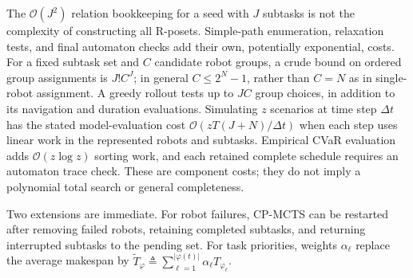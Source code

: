 \begin{revision}
The $\mathcal O(J^2)$ relation bookkeeping for a seed with $J$ subtasks
is not the complexity of constructing all R-posets. Simple-path enumeration,
relaxation tests, and final automaton checks add their own, potentially
exponential, costs. For a fixed subtask set and $C$ candidate robot groups,
a crude bound on ordered group assignments is $J!C^J$; in general
$C\le2^N-1$, rather than $C=N$ as in single-robot assignment.
A greedy rollout tests up to $JC$ group choices, in addition to its
navigation and duration evaluations. Simulating $z$ scenarios at time step
$\Delta t$ has the stated model-evaluation cost
$\mathcal O(zT(J+N)/\Delta t)$ when each step uses linear work in the
represented robots and subtasks. Empirical CVaR evaluation adds
$\mathcal O(z\log z)$ sorting work, and each retained complete schedule
requires an automaton trace check. These are component costs; they do not
imply a polynomial total search or general completeness.
\end{revision}
Two extensions are immediate. For robot failures, CP-MCTS can be restarted
after removing failed robots, retaining completed subtasks, and returning
interrupted subtasks to the pending set. For task priorities, weights
$\alpha_{\ell}$ replace the average makespan by
$\widetilde{T}_{\varphi} \triangleq
\sum_{\ell=1}^{|\varphi(t)|} \alpha_{\ell} T_{\varphi_{\ell}}$.
